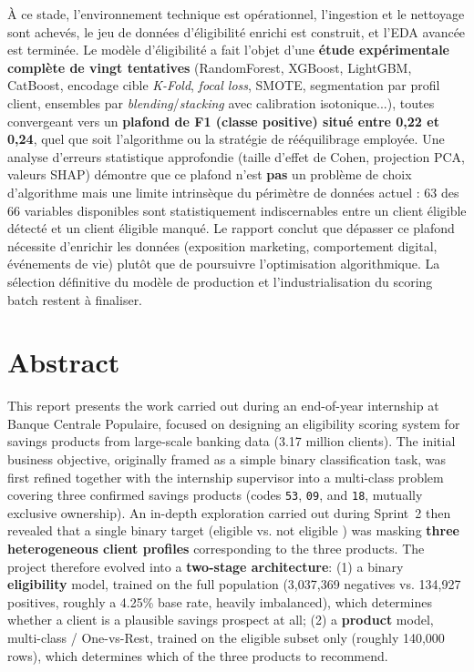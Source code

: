 \documentclass[11pt,a4paper]{report}
\begin{document}
À ce stade, l'environnement technique est opérationnel, l'ingestion et le
nettoyage sont achevés, le jeu de données d'éligibilité enrichi est
construit, et l'EDA avancée est terminée. Le modèle d'éligibilité a fait
l'objet d'une \textbf{étude expérimentale complète de vingt tentatives}
(RandomForest, XGBoost, LightGBM, CatBoost, encodage cible \textit{K-Fold},
\textit{focal loss}, SMOTE, segmentation par profil client, ensembles par
\textit{blending}/\textit{stacking} avec calibration isotonique...), toutes
convergeant vers un \textbf{plafond de F1 (classe positive) situé entre
0,22 et 0,24}, quel que soit l'algorithme ou la stratégie de
rééquilibrage employée. Une analyse d'erreurs statistique approfondie
(taille d'effet de Cohen, projection PCA, valeurs SHAP) démontre que ce
plafond n'est \textbf{pas} un problème de choix d'algorithme mais une
limite intrinsèque du périmètre de données actuel : 63 des 66 variables
disponibles sont statistiquement indiscernables entre un client éligible
détecté et un client éligible manqué. Le rapport conclut que dépasser ce
plafond nécessite d'enrichir les données (exposition marketing,
comportement digital, événements de vie) plutôt que de poursuivre
l'optimisation algorithmique. La sélection définitive du modèle de
production et l'industrialisation du scoring batch restent à finaliser.

\chapter*{Abstract}
This report presents the work carried out during an end-of-year internship
at Banque Centrale Populaire, focused on designing an eligibility scoring
system for savings products from large-scale banking data (3.17 million
clients). The initial business objective, originally framed as a simple
binary classification task, was first refined together with the internship
supervisor into a multi-class problem covering three confirmed savings
products (codes \texttt{53}, \texttt{09}, and \texttt{18}, mutually
exclusive ownership). An in-depth exploration carried out during Sprint~2
then revealed that a single binary target (\og eligible \fg{} vs.
\og not eligible \fg) was masking \textbf{three heterogeneous client
profiles} corresponding to the three products. The project therefore
evolved into a \textbf{two-stage architecture}: (1) a binary
\textbf{eligibility} model, trained on the full population
(3,037,369 negatives vs. 134,927 positives, roughly a 4.25\% base rate,
heavily imbalanced), which determines whether a client is a plausible
savings prospect at all; (2) a \textbf{product} model, multi-class /
One-vs-Rest, trained on the eligible subset only (roughly 140,000 rows),
which determines which of the three products to recommend.
\end{document}
